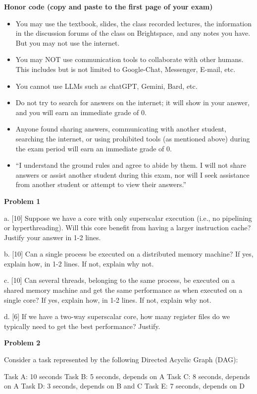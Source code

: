 \documentclass{article}
\begin{document}
\textbf{Honor code (copy and paste to the first page of your exam)}

\begin{itemize}
    \item You may use the textbook, slides, the class recorded lectures, the information in the discussion forums of the class on Brightspace, and any notes you have. But you may not use the internet.
    \item You may NOT use communication tools to collaborate with other humans. This includes but is not limited to Google-Chat, Messenger, E-mail, etc.
    \item You cannot use LLMs such as chatGPT, Gemini, Bard, etc.
    \item Do not try to search for answers on the internet; it will show in your answer, and you will earn an immediate grade of 0.
    \item Anyone found sharing answers, communicating with another student, searching the internet, or using prohibited tools (as mentioned above) during the exam period will earn an immediate grade of 0.
    \item “I understand the ground rules and agree to abide by them. I will not share answers or assist another student during this exam, nor will I seek assistance from another student or attempt to view their answers.”
\end{itemize}

\textbf{Problem 1}

a. [10]  Suppose we have a core with only superscalar execution (i.e., no pipelining or hyperthreading). Will this core benefit from having a larger instruction cache? Justify your answer in 1-2 lines.

b. [10] Can a single process be executed on a distributed memory machine? If yes, explain how, in 1-2 lines. If not, explain why not.

c. [10] Can several threads, belonging to the same process, be executed on a shared memory machine and get the same performance as when executed on a single core? If yes, explain how, in 1-2 lines. If not, explain why not.

d. [6] If we have a two-way superscalar core, how many register files do we typically need to get the best performance? Justify.


\textbf{Problem 2}

Consider a task represented by the following Directed Acyclic Graph (DAG):

Task A: 10 seconds
Task B: 5 seconds, depends on A
Task C: 8 seconds, depends on A
Task D: 3 seconds, depends on B and C
Task E: 7 seconds, depends on D
\end{document}
